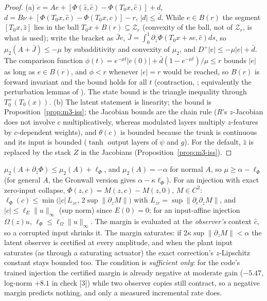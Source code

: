 \begin{proof}
(a) $\dot e=Ae+[\Phi(\hat z,\hat c)-\Phi(T_0x,\hat c)]+d$, $d=B\nu+[\Phi(T_0x,\hat c)-\Phi(T_0x,c)]-r$, $|d|\le\bar d$. While
$e\in B(r)$ the segment $[T_0x,\hat z]$ lies in the ball $T_0x+B(r)\subseteq\mathcal Z_r$ (convexity of the ball,
not of $\mathcal Z_r$, is what is used); write the bracket as $\bar Je$,
$\bar J=\int_0^1\partial_z\Phi(T_0x+se,\hat c)ds$, so $\mu_2(A+\bar J)\le-\mu$ by subadditivity and convexity of $\mu_2$,
and $D^+|e|\le-\mu|e|+\bar d$. The comparison function $\phi(t)=e^{-\mu t}|e(0)|+\bar d(1-e^{-\mu t})/\mu\le r$ bounds
$|e|$ as long as $e\in B(r)$, and $\phi<r$ whenever $|e|=r$ would be reached, so $B(r)$ is forward invariant and the
bound holds for all $t$ (contraction, \citealp{lohmiller1998contraction}; equivalently the perturbation lemmas of
\citealp[Ch.~9]{khalil2002nonlinear}). The state bound is the triangle inequality through $T_0^+(T_0(x))$.
(b) The latent statement is linearity; the bound is Proposition~\ref{prop:m3-iss}; the Jacobian bounds are the chain rule
($R$'s $z$-Jacobian does not involve $c$ multiplicatively, whereas modulated layers multiply $z$-features by $c$-dependent
weights), and $\theta(c)$ is bounded because the trunk is continuous and its input is bounded ($\tanh$ output layers of
$\psi$ and $g$). For the default, $\hat z$ is replaced by the stack $Z$ in the Jacobians (Proposition~\ref{prop:m3-iss}).
\end{proof}

\begin{corollary}\label{cor:m1-amplitude}
$\mu_2(A+\partial_z\Phi)\le\mu_2(A)+\ell_\Phi$, and $\mu_2(A)=-\alpha$ for normal $A$, so $\mu\ge\alpha-\ell_\Phi$
(for general $A$, the Gronwall version gives $\alpha-\kappa\ell_\Phi$). For an injection with exact zero-input
collapse, $\Phi(z,c)=M(z,c)-M(z,0)$, $M\in C^2$: $\ell_\Phi(c)\le\min\big(|c|\,L_{zc},\,2\sup\|\partial_zM\|\big)$ with
$L_{zc}=\sup\|\partial_c\partial_zM\|$, and $|c|\le\ell_E\|u\|_\infty$ (sup norm) since $E(0)=0$; for an input-affine
injection $\Omega(z)u$, $\ell_\Phi\le\ell_\Omega\|u\|_\infty$. The margin is evaluated at the \emph{observer's} context
$\hat c$, so a corrupted input shrinks it. The margin saturates: if $2\kappa\sup\|\partial_zM\|<\alpha$ the latent observer
is certified at every amplitude, and when the plant input saturates (as through a saturating actuator) the exact
correction's $z$-Lipschitz constant stays bounded too. The condition is \emph{sufficient only}: for the code's trained
injection the certified margin is already negative at moderate gain ($-5.47$, log-norm $+8.1$ in check [3]) while two
observer copies still contract, so a negative margin predicts nothing, and only a measured incremental rate does.
\end{corollary}

